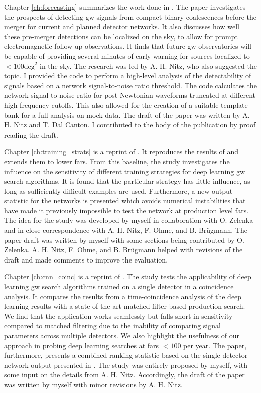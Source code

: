 Chapter \ref{ch:forecasting} summarizes the work done in \cite{Nitz:2020vym}. The paper investigates the prospects of detecting \acrshort{gw} signals from compact binary coalescences before the merger for current and planned detector networks. It also discusses how well these pre-merger detections can be localized on the sky, to allow for prompt electromagnetic follow-up observations. It finds that future \acrshort{gw} observatories will be capable of providing several minutes of early warning for sources localized to $< 100 \text{deg}^2$ in the sky. The research was led by A. H. Nitz, who also suggested the topic. I provided the code to perform a high-level analysis of the detectability of signals based on a network signal-to-noise ratio threshold. The code calculates the network signal-to-noise ratio for post-Newtonian waveforms truncated at different high-frequency cutoffs. This also allowed for the creation of a suitable template bank for a full analysis on mock data. The draft of the paper was written by A. H. Nitz and T. Dal Canton. I contributed to the body of the publication by proof reading the draft.

Chapter \ref{ch:training_strats} is a reprint of \cite{Schafer:2021fea}. It reproduces the results of \cite{Gabbard:2017lja} and extends them to lower \acrshort{far}s. From this baseline, the study investigates the influence on the sensitivity of different training strategies for deep learning \acrshort{gw} search algorithms. It is found that the particular strategy has little influence, as long as sufficiently difficult examples are used. Furthermore, a new output statistic for the networks is presented which avoids numerical instabilities that have made it previously impossible to test the network at production level \acrshort{far}s. The idea for the study was developed by myself in collaboration with O. Zelenka and in close correspondence with A. H. Nitz, F. Ohme, and B. Brügmann. The paper draft was written by myself with some sections being contributed by O. Zelenka. A. H. Nitz, F. Ohme, and B. Brügmann helped with revisions of the draft and made comments to improve the evaluation.

Chapter \ref{ch:cnn_coinc} is a reprint of \cite{Schafer:2021cml}. The study tests the applicability of deep learning \acrshort{gw} search algorithms trained on a single detector in a coincidence analysis. It compares the results from a time-coincidence analysis of the deep learning results with a state-of-the-art matched filter based production search. We find that the application works seamlessly but falls short in sensitivity compared to matched filtering due to the inability of comparing signal parameters across multiple detectors. We also highlight the usefulness of our approach in probing deep learning searches at \acrshort{far}s $<100$ per year. The paper, furthermore, presents a combined ranking statistic based on the single detector network output presented in \cite{Schafer:2021fea}. The study was entirely proposed by myself, with some input on the details from A. H. Nitz. Accordingly, the draft of the paper was written by myself with minor revisions by A. H. Nitz.

